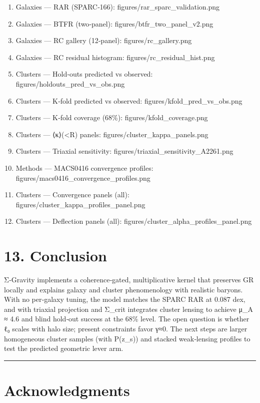 \documentclass[11pt,a4paper]{article}
\begin{document}
\begin{enumerate}
\item Galaxies — RAR (SPARC‑166): figures/rar\_sparc\_validation.png
\item Galaxies — BTFR (two‑panel): figures/btfr\_two\_panel\_v2.png
\item Galaxies — RC gallery (12‑panel): figures/rc\_gallery.png
\item Galaxies — RC residual histogram: figures/rc\_residual\_hist.png
\item Clusters — Hold‑outs predicted vs observed: figures/holdouts\_pred\_vs\_obs.png
\item Clusters — K‑fold predicted vs observed: figures/kfold\_pred\_vs\_obs.png
\item Clusters — K‑fold coverage (68\%): figures/kfold\_coverage.png
\item Clusters — ⟨κ⟩(<R) panels: figures/cluster\_kappa\_panels.png
\item Clusters — Triaxial sensitivity: figures/triaxial\_sensitivity\_A2261.png
\item Methods — MACS0416 convergence profiles: figures/macs0416\_convergence\_profiles.png
\item Clusters — Convergence panels (all): figures/cluster\_kappa\_profiles\_panel.png
\item Clusters — Deflection panels (all): figures/cluster\_alpha\_profiles\_panel.png
\end{enumerate}


\section{13. Conclusion}


Σ‑Gravity implements a coherence‑gated, multiplicative kernel that preserves GR locally and explains galaxy and cluster phenomenology with realistic baryons. With no per‑galaxy tuning, the model matches the SPARC RAR at 0.087 dex, and with triaxial projection and Σ\_crit integrates cluster lensing to achieve μ\_A ≈ 4.6 and blind hold‑out success at the 68\% level. The open question is whether ℓ₀ scales with halo size; present constraints favor γ≈0. The next steps are larger homogeneous cluster samples (with P(z\_s)) and stacked weak‑lensing profiles to test the predicted geometric lever arm.


\medskip\hrule\medskip


\section{Acknowledgments}
\end{document}
